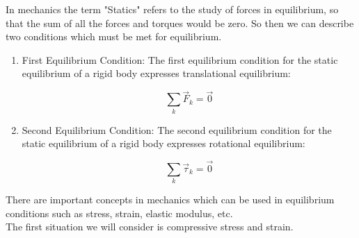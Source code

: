 \documentclass[12pt, letterpaper, twoside]{article}
\begin{document}
\bigskip

In mechanics the term "Statics" refers to the study of forces in equilibrium, so that the sum of all the forces and torques would be zero.  So then we can describe two conditions which must be met for equilibrium.

\begin{enumerate}
	\item First Equilibrium Condition: The first equilibrium condition for the static equilibrium of a rigid body expresses translational equilibrium:
	
	$$ \sum_k \overrightarrow{F}_k = \overrightarrow{0} $$
	\item Second Equilibrium Condition: The second equilibrium condition for the static equilibrium of a rigid body expresses rotational equilibrium:
	
	$$ \sum_k \overrightarrow{\tau}_k = \overrightarrow{0} $$
\end{enumerate}


\bigskip

There are important concepts in mechanics which can be used in equilibrium conditions such as stress, strain, elastic modulus, etc. \\

The first situation we will consider is compressive stress and strain.  

\bigskip


\begin{center}
\end{center}
\end{document}
